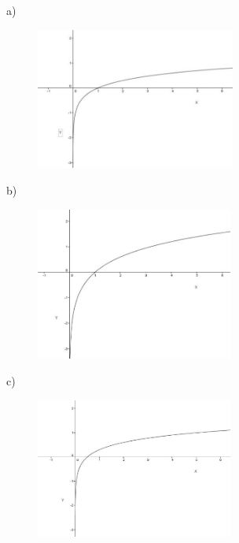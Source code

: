 \begin{respostas}{7}

    \ansitem{}

a)\begin{figure}[H]
    \begin{Center}
        \includegraphics[width=2.58in,height=1.83in]{capitulos/logaritmos_e_funcao_logaritmica/media/image19.jpeg}
    \end{Center}
\end{figure}

b)\begin{figure}[H]
    \begin{Center}
        \includegraphics[width=2.55in,height=1.98in]{capitulos/logaritmos_e_funcao_logaritmica/media/image20.jpeg}
    \end{Center}
\end{figure}

c)\begin{figure}[H]
    \begin{Center}
        \includegraphics[width=2.56in,height=1.81in]{capitulos/logaritmos_e_funcao_logaritmica/media/image21.jpeg}
    \end{Center}
\end{figure}


\end{respostas}
